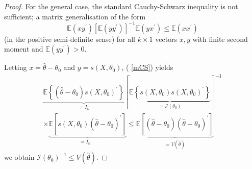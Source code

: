 \documentclass[notes=show]{beamer}
\begin{document}
\begin{frame}%

\begin{proof}
For the general case, the standard Cauchy-Schwarz inequality is not
sufficient; a matrix generalisation of the form%
\begin{equation}
\mathbb{E}\left( xy^{\prime }\right) \left[ \mathbb{E}\left( yy^{\prime
}\right) \right] ^{-1}\mathbb{E}\left( yx^{\prime }\right) \leq \mathbb{E}%
\left( xx^{\prime }\right)  \label{mCS}
\end{equation}%
(in the positive semi-definite sense) for all $k\times 1$ vectors $x,y$ with
finite second moment and $\mathbb{E}\left( yy^{\prime }\right) >0$.

Letting $x=\hat{\theta}-\theta _{0}$ and $y=s\left( X,\theta _{0}\right) $, (%
\ref{mCS}) yields%
\begin{gather*}
\underset{=I_{k}}{\underbrace{\mathbb{E}\left\{ \left( \hat{\theta}-\theta
_{0}\right) s\left( X,\theta _{0}\right) ^{\prime }\right\} }}[\underset{=%
\mathcal{I}\left( \theta _{0}\right) }{\underbrace{\mathbb{E}\left\{ s\left(
X,\theta _{0}\right) s\left( X,\theta _{0}\right) ^{\prime }\right\} }}]^{-1}
\\
\underset{=I_{k}}{\times \underbrace{\mathbb{E}\left[ s\left( X,\theta
_{0}\right) \left( \hat{\theta}-\theta _{0}\right) ^{\prime }\right] }}\leq 
\underset{=V\left( \hat{\theta}\right) }{\underbrace{\mathbb{E}\left[ \left( 
\hat{\theta}-\theta _{0}\right) \left( \hat{\theta}-\theta _{0}\right)
^{\prime }\right] }}
\end{gather*}%
we obtain $\mathcal{I}\left( \theta _{0}\right) ^{-1}\leq V\left( \hat{\theta%
}\right) $.
\end{proof}

\end{frame}%
\end{document}

